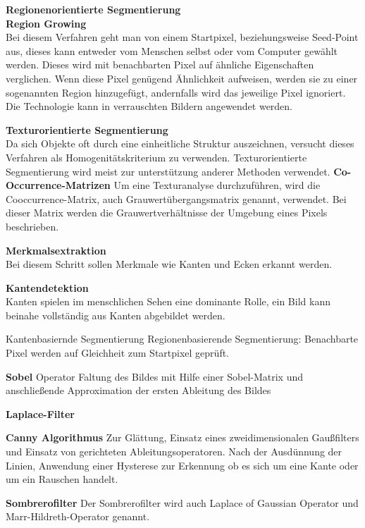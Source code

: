     \textbf{Regionenorientierte Segmentierung}\\ \cite{Seg_region}
    \textbf{Region Growing}\\ 
    Bei diesem Verfahren geht man von einem Startpixel, beziehungsweise Seed-Point aus, dieses kann entweder vom Menschen selbst oder vom Computer gewählt werden. Dieses wird mit benachbarten Pixel auf ähnliche Eigenschaften verglichen. Wenn diese Pixel genügend Ähnlichkeit aufweisen, werden sie zu einer sogenannten Region hinzugefügt, andernfalls wird das jeweilige Pixel ignoriert. Die Technologie kann in verrauschten Bildern angewendet werden.

    \textbf{Texturorientierte Segmentierung}\\ \cite{Seg_textur}
    Da sich Objekte oft durch eine einheitliche Struktur auszeichnen, versucht dieses Verfahren als Homogenitätskriterium zu verwenden. Texturorientierte Segmentierung wird meist zur unterstützung anderer Methoden verwendet.
    \textbf{Co-Occurrence-Matrizen}
    Um eine Texturanalyse durchzuführen, wird die Cooccurrence-Matrix, auch Grauwertübergangsmatrix genannt, verwendet. \cite{seg_coocc}
    Bei dieser Matrix werden die Grauwertverhältnisse der Umgebung eines Pixels beschrieben.

    \textbf{Merkmalsextraktion}\\
    Bei diesem Schritt sollen Merkmale wie Kanten und Ecken erkannt werden.

    \textbf{Kantendetektion}\\
    Kanten spielen im menschlichen Sehen eine dominante Rolle, ein Bild kann beinahe vollständig aus Kanten abgebildet werden.

    Kantenbasiernde Segmentierung
    Regionenbasierende Segmentierung: Benachbarte Pixel werden auf Gleichheit zum Startpixel geprüft.

    \textbf{Sobel} Operator Faltung des Bildes mit Hilfe einer Sobel-Matrix und anschließende Approximation der ersten Ableitung des Bildes
    
    \textbf{Laplace-Filter}

    \textbf{Canny Algorithmus} Zur Glättung, Einsatz eines zweidimensionalen Gaußfilters und Einsatz von gerichteten Ableitungsoperatoren. Nach der Ausdünnung der Linien, Anwendung einer Hysterese zur Erkennung ob es sich um eine Kante oder um ein Rauschen handelt.

    \textbf{Sombrerofilter} Der Sombrerofilter wird auch Laplace of Gaussian Operator und Marr-Hildreth-Operator genannt.

